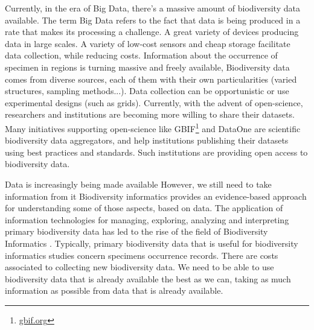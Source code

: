 






%

Currently, in the era of Big Data, there's a massive amount of biodiversity data available. 
The term Big Data refers to the fact that data is being produced in a rate that makes its processing a challenge.
A great variety of devices producing data in large scales.
A variety of low-cost sensors and cheap storage facilitate data collection, while reducing costs.
Information about the occurrence of specimen in regions is turning massive and freely available,
Biodiversity data comes from diverse sources, each of them with their own particularities (varied structures, sampling methods...).
Data collection can be opportunistic or use experimental designs (such as grids).
Currently, with the advent of open-science, researchers and institutions are becoming more willing to share their datasets. 
Many initiatives supporting open-science like GBIF\footnote{\url{gbif.org}} \cite{gbif} and DataOne are scientific biodiversity data aggregators, and help institutions publishing their datasets using best practices and standards. %
Such institutions are providing open access to biodiversity data.



Data is increasingly being made available
However, we still need to take information from it
Biodiversity informatics provides an evidence-based approach for understanding some of those aspects, based on data.
The application of information technologies for managing, exploring, analyzing and interpreting primary biodiversity data has led to the rise of the field of Biodiversity Informatics \cite{Soberon2004}.
Typically, primary biodiversity data that is useful for biodiversity informatics studies concern specimens occurrence records.
There are costs associated to collecting new biodiversity data.
We need to be able to use biodiversity data that is already available the best as we can, taking as much information as possible from data that is already available.

